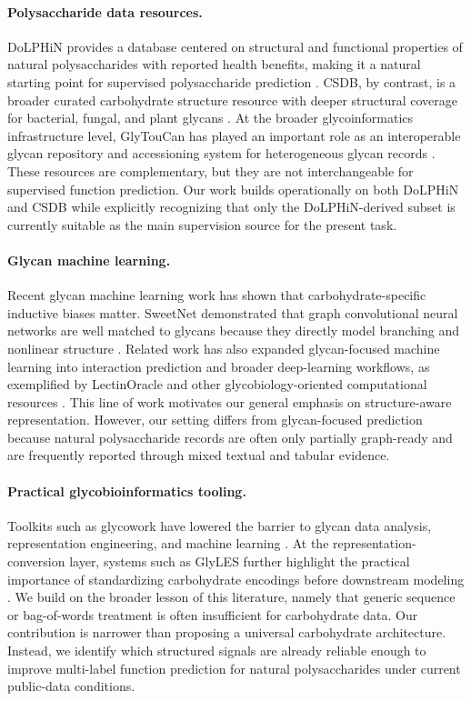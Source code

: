\documentclass{article}
\begin{document}
\paragraph{Polysaccharide data resources.}
DoLPHiN provides a database centered on structural and functional properties of natural polysaccharides with reported health benefits, making it a natural starting point for supervised polysaccharide prediction \cite{xin2025dolphin}. CSDB, by contrast, is a broader curated carbohydrate structure resource with deeper structural coverage for bacterial, fungal, and plant glycans \cite{toukach2022csdb}. At the broader glycoinformatics infrastructure level, GlyTouCan has played an important role as an interoperable glycan repository and accessioning system for heterogeneous glycan records \cite{tiemeyer2017glytoucan,fujita2021glytoucan3}. These resources are complementary, but they are not interchangeable for supervised function prediction. Our work builds operationally on both DoLPHiN and CSDB while explicitly recognizing that only the DoLPHiN-derived subset is currently suitable as the main supervision source for the present task.

\paragraph{Glycan machine learning.}
Recent glycan machine learning work has shown that carbohydrate-specific inductive biases matter. SweetNet demonstrated that graph convolutional neural networks are well matched to glycans because they directly model branching and nonlinear structure \cite{burkholz2021sweetnet}. Related work has also expanded glycan-focused machine learning into interaction prediction and broader deep-learning workflows, as exemplified by LectinOracle and other glycobiology-oriented computational resources \cite{lundstrom2022lectinoracle,bojar2021deeplearningresources}. This line of work motivates our general emphasis on structure-aware representation. However, our setting differs from glycan-focused prediction because natural polysaccharide records are often only partially graph-ready and are frequently reported through mixed textual and tabular evidence.

\paragraph{Practical glycobioinformatics tooling.}
Toolkits such as glycowork have lowered the barrier to glycan data analysis, representation engineering, and machine learning \cite{thomes2021glycowork}. At the representation-conversion layer, systems such as GlyLES further highlight the practical importance of standardizing carbohydrate encodings before downstream modeling \cite{joeres2023glyles}. We build on the broader lesson of this literature, namely that generic sequence or bag-of-words treatment is often insufficient for carbohydrate data. Our contribution is narrower than proposing a universal carbohydrate architecture. Instead, we identify which structured signals are already reliable enough to improve multi-label function prediction for natural polysaccharides under current public-data conditions.
\end{document}
